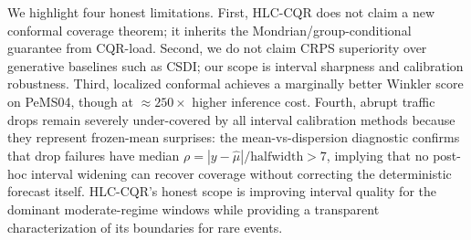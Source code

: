 \documentclass[letterpaper,journal]{IEEEtran}
\begin{document}
We highlight four honest limitations.  First, HLC-CQR does not claim a new
conformal coverage theorem; it inherits the Mondrian/group-conditional
guarantee from CQR-load.  Second, we do not claim CRPS superiority over
generative baselines such as CSDI; our scope is interval sharpness and
calibration robustness.  Third, localized conformal achieves a marginally
better Winkler score on PeMS04, though at $\approx250\times$ higher
inference cost.  Fourth, abrupt traffic drops remain severely under-covered
by all interval calibration methods because they represent frozen-mean
surprises: the mean-vs-dispersion diagnostic confirms that drop failures
have median $\rho=|y-\hat{\mu}|/\text{halfwidth}>7$, implying that no
post-hoc interval widening can recover coverage without correcting the
deterministic forecast itself.  HLC-CQR's honest scope is improving
interval quality for the dominant moderate-regime windows while providing
a transparent characterization of its boundaries for rare events.



\end{document}
